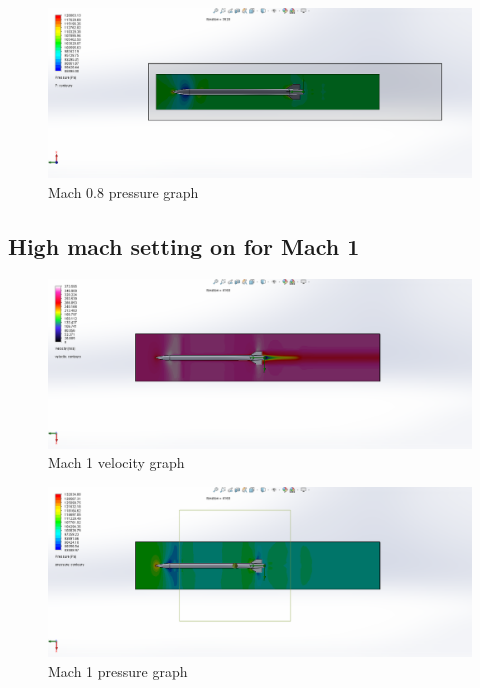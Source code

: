 \documentclass{article}
\begin{document}
\begin{figure}[H]
\centering
\includegraphics[width=\textwidth]{Mach08Pressure}
\caption{Mach 0.8 pressure graph}
\label{fig:Mach08Pressure}
\end{figure}

\subsection{High mach setting on for Mach 1}
\begin{figure}[H]
\centering
\includegraphics[width=\textwidth]{Mach1Speed}
\caption{Mach 1 velocity graph}
\label{fig:Mach1Speed}
\end{figure}

\begin{figure}[H]
\centering
\includegraphics[width=\textwidth]{Mach1Pressure}
\caption{Mach 1 pressure graph}
\label{fig:Mach1Pressure}
\end{figure}
\end{document}
